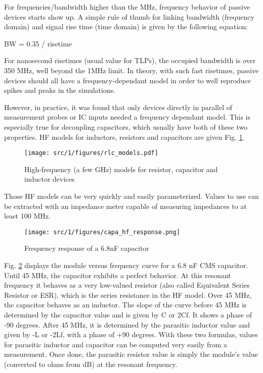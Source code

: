 For frequencies/bandwidth higher than the MHz, frequency behavior of  passive devices starts show up.
A simple rule of thumb for linking bandwidth (frequency domain) and signal rise time (time domain) is given by the following equation:

BW = 0.35 / risetime

For nanosecond risetimes (usual value for TLPs), the occupied bandwidth is over 350 MHz, well beyond the 1MHz limit.
In theory, with such fast risetimes, passive devices should all have a frequency-dependant model in order to well reproduce spikes and peaks in the simulations.

However, in practice, it was found that only devices directly in parallel of measurement probes or IC inputs needed a frequency dependant model.
This is especially true for decoupling capacitors, which usually have both of these two properties.
HF models for inductors, resistors and capacitors are given Fig. \ref{fig:rlc-esd-models}.

\begin{figure}[!h]
  \centering
  \texttt{[image: src/1/figures/rlc\_models.pdf]}
  \caption{High-frequency (a few GHz) models for resistor, capacitor and inductor devices}
  \label{fig:rlc-esd-models}
\end{figure}

Those HF models can be very quickly and easily parameterized.
Values to use can be extracted with an impedance meter capable of measuring impedances to at least 100 MHz.

\begin{figure}[!h]
  \centering
  \texttt{[image: src/1/figures/capa\_hf\_response.png]}
  \caption{Frequency response of a 6.8nF capacitor}
  \label{fig:frequency-response-capa}
\end{figure}

Fig. \ref{fig:frequency-response-capa} displays the module versus frequency curve for a 6.8 nF CMS capacitor.
Until 45 MHz, the capacitor exhibits a perfect behavior.
At this resonant frequency it behaves as a very low-valued resistor (also called Equivalent Series Resistor or ESR), which is the series resistance in the HF model.
Over 45 MHz, the capacitor behaves as an inductor.
The slope of the curve before 45 MHz is determined by the capacitor value and is given by C\textomega{} or 2\textomega{}Cf.
It shows a phase of -90 degrees.
After 45 MHz, it is determined by the parasitic inductor value and given by -L\textomega{} or -2\textomega{}Lf, with a phase of +90 degrees.
With these two formulas, values for parasitic inductor and capacitor can be computed very easily from a measurement.
Once done, the parasitic resistor value is simply the module’s value (converted to ohms from dB) at the resonant frequency.


